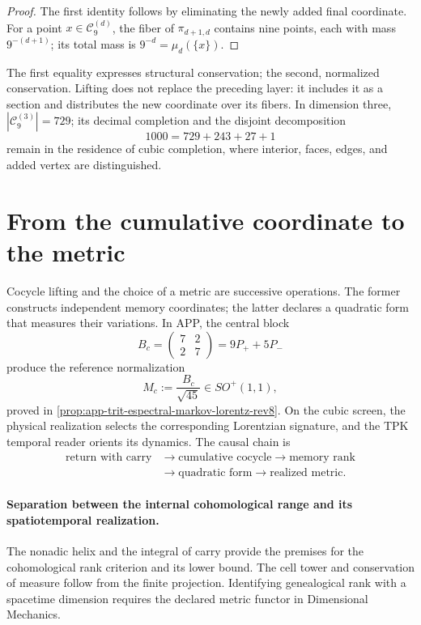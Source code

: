\begin{proof}
The first identity follows by eliminating the newly added final
coordinate. For a point \(x\in\mathcal C_9^{(d)}\), the fiber of
\(\pi_{d+1,d}\) contains nine points, each with mass
\(9^{-(d+1)}\); its total mass is \(9^{-d}=\mu_d(\{x\})\).
\end{proof}

The first equality expresses structural conservation; the second,
normalized conservation. Lifting does not replace the preceding layer: it includes it
as a section and distributes the new coordinate over its fibers. In dimension
three, \(|\mathcal C_9^{(3)}|=729\); its decimal completion and the
disjoint decomposition
\[
 1000=729+243+27+1
\]
remain in the residence of cubic completion, where
interior, faces, edges, and added vertex are distinguished.

\section{From the cumulative coordinate to the metric}

Cocycle lifting and the choice of a metric are successive
operations. The former constructs independent memory coordinates; the
latter declares a quadratic form that measures their variations. In APP, the
central block
\[
 B_c=\begin{pmatrix}7&2\\2&7\end{pmatrix}=9P_++5P_-
\]
produce the reference normalization
\[
 M_c:=\frac{B_c}{\sqrt{45}}\in SO^+(1,1),
\]
proved in \cref{prop:app-trit-espectral-markov-lorentz-rev8}.
On the cubic screen, the physical realization selects the
corresponding Lorentzian signature, and the TPK temporal reader orients its
dynamics. The causal chain is
\[
 \begin{aligned}
 \text{return with carry}
 &\longrightarrow\text{cumulative cocycle}
 \longrightarrow\text{memory rank}\\
 &\longrightarrow\text{quadratic form}
 \longrightarrow\text{realized metric}.
 \end{aligned}
\]

\paragraph{Separation between the internal cohomological range and its spatiotemporal realization.}
The nonadic helix and the integral of carry provide the premises for the cohomological rank criterion and its lower bound. The cell tower and conservation of measure follow from the finite projection. Identifying genealogical rank with a spacetime dimension requires the declared metric functor in Dimensional Mechanics.
